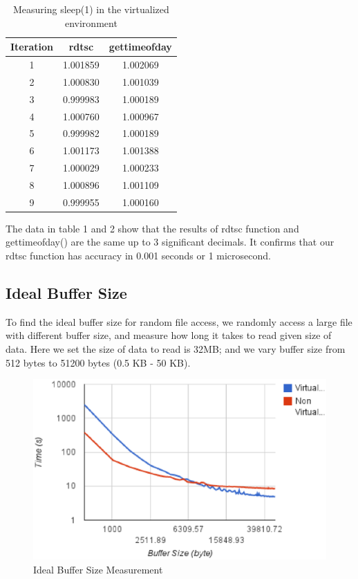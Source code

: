 \begin{table}[!thb]
\centering
\begin{tabular}{|c|c|c|} \hline
Iteration & rdtsc & gettimeofday \\ \hline
1 & 1.001859 & 1.002069 \\ \hline
2 & 1.000830 & 1.001039 \\ \hline
3 & 0.999983 & 1.000189 \\ \hline
4 & 1.000760 & 1.000967 \\ \hline
5 & 0.999982 & 1.000189 \\ \hline
6 & 1.001173 & 1.001388 \\ \hline
7 & 1.000029 & 1.000233 \\ \hline
8 & 1.000896 & 1.001109 \\ \hline
9 & 0.999955 & 1.000160 \\ \hline
\end{tabular}
\label{tab:cali_virtual}
\caption{Measuring sleep(1) in the virtualized environment}
\end{table}

The data in table 1 and 2 show that the results of rdtsc function and gettimeofday() are the same up to 3 significant decimals. It confirms that our rdtsc function has accuracy in 0.001 seconds or 1 microsecond.

\subsection{Ideal Buffer Size}
To find the ideal buffer size for random file access, we randomly access a large file with different buffer size, and measure how long it takes to read given size of data. Here we set the size of data to read is 32MB; and we vary buffer size from 512 bytes to 51200 bytes (0.5 KB - 50 KB). 

\begin{figure}
\centering
\includegraphics[width=.65\textwidth]{figures/buffer_size.eps}
\caption{Ideal Buffer Size Measurement}
\label{fig:buffer_size}
\end{figure}

